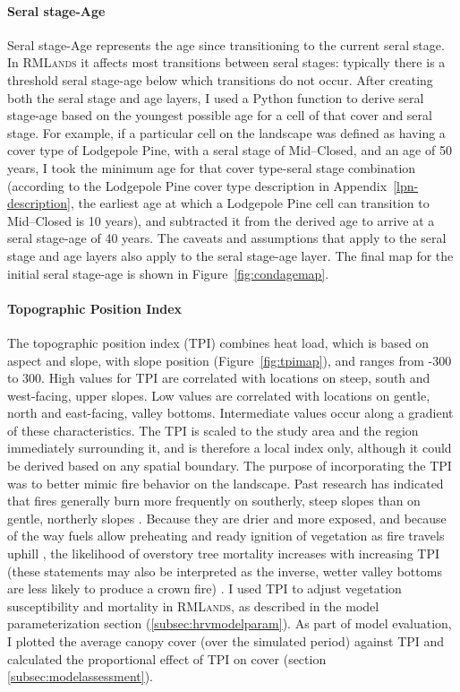 \paragraph*{Seral stage-Age}
Seral stage-Age represents the age since transitioning to the current seral stage. In \textsc{RMLands} it affects most transitions between seral stages: typically there is a threshold seral stage-age below which transitions do not occur. After creating both the seral stage and age layers, I used a Python function to derive seral stage-age based on the youngest possible age for a cell of that cover and seral stage. For example, if a particular cell on the landscape was defined as having a cover type of Lodgepole Pine, with a seral stage of Mid--Closed, and an age of 50 years, I took the minimum age for that cover type-seral stage combination (according to the Lodgepole Pine cover type description in Appendix~\ref{lpn-description}, the earliest age at which a Lodgepole Pine cell can transition to Mid--Closed is 10 years), and subtracted it from the derived age to arrive at a seral stage-age of 40 years. The caveats and assumptions that apply to the seral stage and age layers also apply to the seral stage-age layer. The final map for the initial seral stage-age is shown in Figure~\ref{fig:condagemap}.


\paragraph*{Topographic Position Index}
The topographic position index (TPI) combines heat load, which is based on aspect and slope, with slope position (Figure~\ref{fig:tpimap}), and ranges from -300 to 300. High values for TPI are correlated with locations on steep, south and west-facing, upper slopes. Low values are correlated with locations on gentle, north and east-facing, valley bottoms. Intermediate values occur along a gradient of these characteristics. The TPI is scaled to the study area and the region immediately surrounding it, and is therefore a local index only, although it could be derived based on any spatial boundary. The purpose of incorporating the TPI was to better mimic fire behavior on the landscape. Past research has indicated that fires generally burn more frequently on southerly, steep slopes than on gentle, northerly slopes \citep{Beaty2001}. Because they are drier and more exposed, and because of the way fuels allow preheating and ready ignition of vegetation as fire travels uphill \citep{Rothermel1983}, the likelihood of overstory tree mortality increases with increasing TPI (these statements may also be interpreted as the inverse, wetter valley bottoms are less likely to produce a crown fire) \citep{Beaty2001,Taylor2003a,North2012}. I used TPI to adjust vegetation susceptibility and mortality in \textsc{RMLands}, as described in the model parameterization section (\ref{subsec:hrvmodelparam}). As part of model evaluation, I plotted the average canopy cover (over the simulated period) against TPI and calculated the proportional effect of TPI on cover (section \ref{subsec:modelassessment}).



